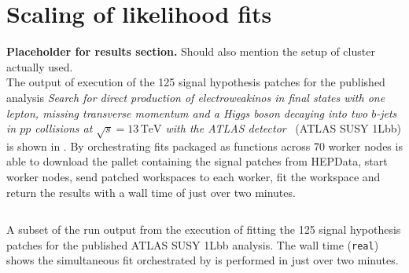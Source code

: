 \section{Scaling of likelihood fits}\label{sec:results}

\textbf{Placeholder for results section.}
Should also mention the setup of cluster actually used.\\

The output of execution of the 125 signal hypothesis patches for the published analysis \textit{Search for direct production of electroweakinos in final states with one lepton, missing transverse momentum and a Higgs boson decaying into two \(b\)-jets in \(pp\) collisions at \(\sqrt{s} = 13\,\text{TeV}\) with the ATLAS detector}~\cite{SUSY-2019-08} (ATLAS SUSY 1Lbb) is shown in .
By orchestrating \pyhf{} fits packaged as \funcX{} functions across 70 worker nodes \funcX{} is able to download the \pyhf{} pallet containing the signal patches from HEPData, start \funcX{} worker nodes, send patched workspaces to each worker, fit the workspace and return the results with a wall time of just over two minutes.
\\

\begin{listing}
 \inputminted{text}{src/code/funcX_demo_output.txt}
 \caption{A subset of the run output from the execution of fitting the 125 signal hypothesis patches for the published ATLAS SUSY 1Lbb analysis.
 The wall time (\texttt{real}) shows the simultaneous fit orchestrated by \funcX{} is performed in just over two minutes.}
 \label{lst:funcX_demo_output}
\end{listing}
